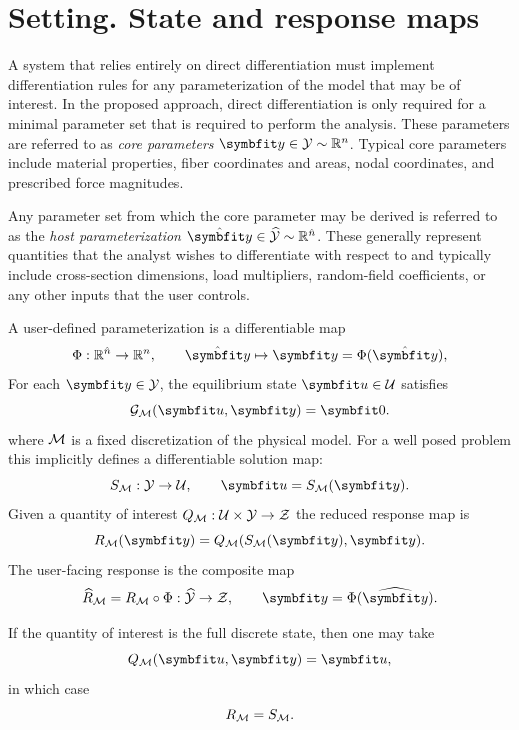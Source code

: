 \section{Setting. State and response maps}




A system that relies entirely on direct differentiation must implement differentiation rules for any parameterization of the model that may be of interest. 
In the proposed approach, direct differentiation is only required for a minimal parameter set that is required to perform the analysis. 
These parameters are referred to as \emph{core parameters} $\corey \in \CoreSpace\sim\mathbb{R}^{\ncore}$.  
Typical core parameters include material properties, fiber coordinates and areas, nodal
coordinates, and prescribed force magnitudes. 


Any parameter set from which the core parameter may be derived is referred to as the \emph{host parameterization} $\haty \in \HostSpace\sim\mathbb{R}^{\nhost}$. 
These generally represent quantities that the analyst wishes to differentiate with respect to and typically include  cross-section dimensions, load
multipliers, random-field coefficients, or any other inputs that the
user controls.


A user-defined parameterization is a differentiable map
\begin{equation}\label{eq:Ymap}
    \Ymap : \mathbb{R}^{\nhost} \to \mathbb{R}^{\ncore},
    \qquad \haty \mapsto \corey = \Ymap(\haty),
\end{equation}
For each \(\CoreParameters \in \CoreSpace\), the equilibrium state \(\State \in \StateSpace\) satisfies
\[
\Residual_{\ModelFamily}(\State,\CoreParameters) = \bm 0.
\]
where \(\mathcal M\) is a fixed discretization of the physical model. 
For a well posed problem this implicitly defines a differentiable solution map:
\[
\StateMap_{\ModelFamily} : \CoreSpace \to \StateSpace,
\qquad
\State = \StateMap_{\ModelFamily}(\CoreParameters).
\]
Given a quantity of interest \(
Q_{\mathcal M} : \mathcal U \times \mathcal Y \to \mathcal Z
\) 
the reduced response map is
\begin{equation}
\ResponseMap_{\ModelFamily}(\CoreParameters)
=
\Observation_{\ModelFamily}(\StateMap_{\ModelFamily}(\CoreParameters),\CoreParameters).
\label{eq:def-reduced-map}
\end{equation}
The user-facing response is the composite map
\[
\ComposedResponse_{\ModelFamily}
=
\ResponseMap_{\ModelFamily}\circ\ParameterMap
:
\HostSpace \to \ResponseSpace,
\qquad
\CoreParameters=\ParameterMap(\HostParameters).
\]
\begin{remark}
If the quantity of interest is the full discrete state, then one may take
\[
\Observation_{\ModelFamily}(\State,\CoreParameters)=\State,
\]
in which case
\[
R_{\mathcal M}=S_{\mathcal M}.
\]
\end{remark}

